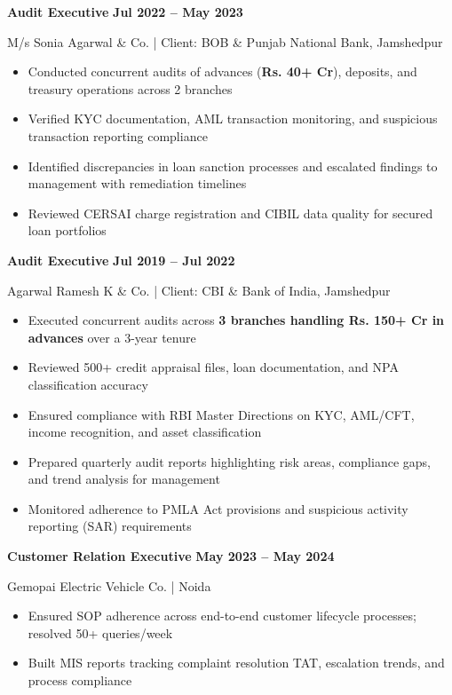 \documentclass[a4paper,11pt]{article}
\begin{document}
\vspace{6pt}
\noindent\textbf{Audit Executive} \hfill \textbf{Jul 2022 -- May 2023}

\noindent M/s Sonia Agarwal \& Co. | Client: BOB \& Punjab National Bank, Jamshedpur

\begin{itemize}[leftmargin=16pt, itemsep=1pt, topsep=3pt]
\item Conducted concurrent audits of advances (\textbf{Rs. 40+ Cr}), deposits, and treasury operations across 2 branches
\item Verified KYC documentation, AML transaction monitoring, and suspicious transaction reporting compliance
\item Identified discrepancies in loan sanction processes and escalated findings to management with remediation timelines
\item Reviewed CERSAI charge registration and CIBIL data quality for secured loan portfolios
\end{itemize}

\vspace{6pt}
\noindent\textbf{Audit Executive} \hfill \textbf{Jul 2019 -- Jul 2022}

\noindent Agarwal Ramesh K \& Co. | Client: CBI \& Bank of India, Jamshedpur

\begin{itemize}[leftmargin=16pt, itemsep=1pt, topsep=3pt]
\item Executed concurrent audits across \textbf{3 branches handling Rs. 150+ Cr in advances} over a 3-year tenure
\item Reviewed 500+ credit appraisal files, loan documentation, and NPA classification accuracy
\item Ensured compliance with RBI Master Directions on KYC, AML/CFT, income recognition, and asset classification
\item Prepared quarterly audit reports highlighting risk areas, compliance gaps, and trend analysis for management
\item Monitored adherence to PMLA Act provisions and suspicious activity reporting (SAR) requirements
\end{itemize}

\vspace{6pt}
\noindent\textbf{Customer Relation Executive} \hfill \textbf{May 2023 -- May 2024}

\noindent Gemopai Electric Vehicle Co. | Noida

\begin{itemize}[leftmargin=16pt, itemsep=1pt, topsep=3pt]
\item Ensured SOP adherence across end-to-end customer lifecycle processes; resolved 50+ queries/week
\item Built MIS reports tracking complaint resolution TAT, escalation trends, and process compliance
\end{itemize}
\end{document}
